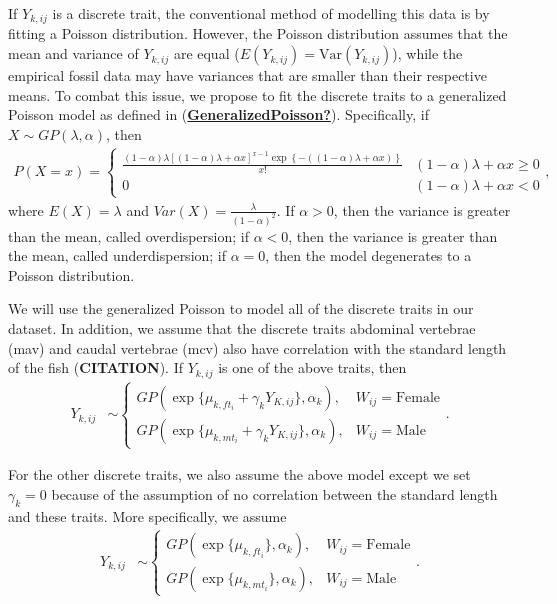 \documentclass[
  12pt,
]{article}
\begin{document}
If \(Y_{k,ij}\) is a discrete trait, the conventional method of
modelling this data is by fitting a Poisson distribution. However, the
Poisson distribution assumes that the mean and variance of \(Y_{k,ij}\)
are equal (\(E(Y_{k,ij}) = \text{Var}(Y_{k,ij})\)), while the empirical
fossil data may have variances that are smaller than their respective
means. To combat this issue, we propose to fit the discrete traits to a
generalized Poisson model as defined in
(\protect\hyperlink{ref-GeneralizedPoisson}{\textbf{GeneralizedPoisson?}}).
Specifically, if \(X \sim GP(\lambda,\alpha)\), then \begin{align}
P(X = x) = \left\{\begin{array}{cc} \frac{(1 - \alpha)\lambda[(1 - \alpha)\lambda + \alpha x]^{x - 1} \exp\left\{-((1 - \alpha)\lambda  + \alpha x)\right\}}{x!} & (1 - \alpha)\lambda  + \alpha x \geq 0  \\ 0 & (1 - \alpha)\lambda  + \alpha x < 0 \end{array}\right.,
\label{eq:GP_pmf}
\end{align} where \(E(X) = \lambda\) and
\(Var(X) = \frac{\lambda}{(1 - \alpha)^2}\). If \(\alpha > 0\), then the
variance is greater than the mean, called overdispersion; if
\(\alpha < 0\), then the variance is greater than the mean, called
underdispersion; if \(\alpha = 0\), then the model degenerates to a
Poisson distribution.

We will use the generalized Poisson to model all of the discrete traits
in our dataset. In addition, we assume that the discrete traits
abdominal vertebrae (mav) and caudal vertebrae (mcv) also have
correlation with the standard length of the fish (\textbf{CITATION}). If
\(Y_{k,ij}\) is one of the above traits, then \begin{align}
{Y}_{k,ij} & \sim \left\{\begin{array}{ll} GP(\exp\{\mu_{k,ft_i} + \gamma_kY_{K,ij}\},\alpha_k), & W_{ij} = \text{Female} \\ GP(\exp\{\mu_{k,mt_i} + \gamma_kY_{K,ij}\},\alpha_k), & W_{ij} = \text{Male} \end{array}\right..
\label{eq:disc_corr}
\end{align}

For the other discrete traits, we also assume the above model except we
set \(\gamma_k = 0\) because of the assumption of no correlation between
the standard length and these traits. More specifically, we assume
\begin{align}
{Y}_{k,ij} & \sim \left\{\begin{array}{ll} GP(\exp\{\mu_{k,ft_i}\},\alpha_k), & W_{ij} = \text{Female} \\ GP(\exp\{\mu_{k,mt_i}\},\alpha_k), & W_{ij} = \text{Male} \end{array}\right..
\label{eq:disc_ind}
\end{align}
\end{document}
